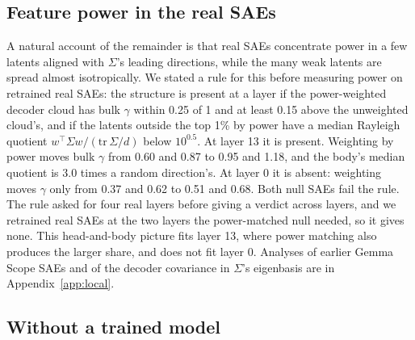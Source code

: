 \documentclass[10pt,twocolumn]{article}
\newcommand{\Sig}{\Sigma}
\begin{document}
\subsection{Feature power in the real SAEs}
\label{sec:what}

A natural account of the remainder is that real SAEs concentrate power in a few latents aligned with $\Sig$'s leading directions, while the many weak latents are spread almost isotropically. We stated a rule for this before measuring power on retrained real SAEs: the structure is present at a layer if the power-weighted decoder cloud has bulk $\gamma$ within 0.25 of 1 and at least 0.15 above the unweighted cloud's, and if the latents outside the top 1\% by power have a median Rayleigh quotient $w^\top\Sig w/(\mathrm{tr}\,\Sig/d)$ below $10^{0.5}$. At layer 13 it is present. Weighting by power moves bulk $\gamma$ from 0.60 and 0.87 to 0.95 and 1.18, and the body's median quotient is 3.0 times a random direction's. At layer 0 it is absent: weighting moves $\gamma$ only from 0.37 and 0.62 to 0.51 and 0.68. Both null SAEs fail the rule. The rule asked for four real layers before giving a verdict across layers, and we retrained real SAEs at the two layers the power-matched null needed, so it gives none. This head-and-body picture fits layer 13, where power matching also produces the larger share, and does not fit layer 0. Analyses of earlier Gemma Scope SAEs and of the decoder covariance in $\Sig$'s eigenbasis are in Appendix~\ref{app:local}.

\subsection{Without a trained model}
\label{sec:ladder}

\begin{table}[t]
\centering
\caption{The real / equal-power / power-matched comparison with and without a trained model, $k=40$, $\gamma$ at 8,192 live latents. Each dataset has its own $\Sig$. FVU: mean of the three real SAEs; $\rho$: the dense share at which both nulls matched it (within 0.03). $R$: real, three seeds; $Z$: equal-power null, two seeds; $N$: power-matched null, one seed; $G=Z-R$; Rem $=N-R$. embT: trained Gemma-2-2B input embeddings; embR: random embedding matrix; randL0, randL13: blocks 0 and 13 of a randomly initialised Gemma-2-2B. Gemma rows are the existing results ($Z$ two seeds, $N$ the first run's seed 0, as the rule specifies). Verdict by the rule fixed in advance, against the Gemma row above it; in brackets the ratio of the random dataset's remainder to the trained one in the two bulk windows (``persists'' needs at least 0.70 in both). $^\dagger$The rule's verdict; we read randL13 as uninformative in practice (see text).}
\label{tab:ladder}
\footnotesize
\setlength{\tabcolsep}{3pt}

\end{table}
\end{document}
